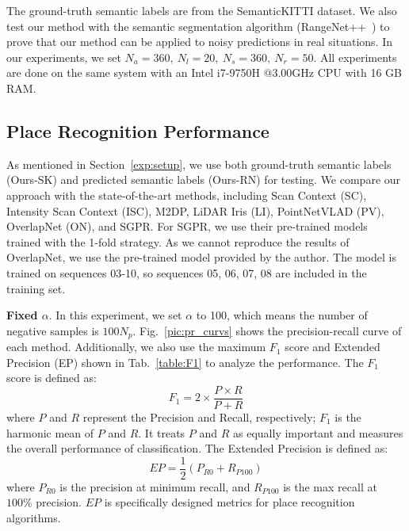 \documentclass[letterpaper, 10 pt, conference]{ieeeconf}
\begin{document}
The ground-truth semantic labels are from the SemanticKITTI dataset\cite{semkitti}. We also test our method with the semantic segmentation algorithm (RangeNet++~\cite{rangenet++})  to prove that our method can be applied to noisy predictions in real situations. In our experiments, we set \(N_a=360,~N_l=20,~N_s=360,~N_r=50\). All experiments are done on the same system with an Intel i7-9750H @3.00GHz CPU with 16 GB RAM.

\subsection{Place Recognition Performance}\label{seu:pr}
As mentioned in Section~\ref{exp:setup}, we use both ground-truth semantic labels (Ours-SK) and predicted semantic labels (Ours-RN) for testing. We compare our approach with the state-of-the-art methods, including Scan Context\cite{SC} (SC), Intensity Scan Context\cite{ISC} (ISC), M2DP\cite{M2DP}, LiDAR Iris\cite{LI} (LI), PointNetVLAD\cite{PV} (PV), OverlapNet\cite{ON} (ON), and SGPR\cite{SGPR}. For SGPR, we use their pre-trained models trained with the 1-fold strategy. As we cannot reproduce the results of OverlapNet, we use the pre-trained model provided by the author. The model is trained on sequences 03-10, so sequences 05, 06, 07, 08 are included in the training set.

\textbf{Fixed \(\alpha\)}. In this experiment, we set \(\alpha\) to 100, which means the number of negative samples is \(100N_{p}\). Fig.~\ref{pic:pr_curvs} shows the precision-recall curve of each method. Additionally, we also use the maximum \(F_1\) score and Extended Precision\cite{EP} (EP) shown in Tab.~\ref{table:F1} to analyze the performance. The \(F_1\) score is defined as:
\begin{equation}
    F_1=2\times \frac{P\times R}{P+R}
\end{equation}
where \(P\) and \(R\) represent the Precision and Recall, respectively; \(F_1\) is the harmonic mean of \(P\) and \(R\). It treats \(P\) and \(R\) as equally important and measures the overall performance of classification. The Extended Precision is defined as:
\begin{equation}
    EP=\frac{1}{2}(P_{R0}+R_{P100})
\end{equation}
where \(P_{R0}\) is the precision at minimum recall, and \(R_{P100}\) is the max recall at \(100\%\) precision. \(EP\) is specifically designed metrics for place recognition algorithms. 
\end{document}
